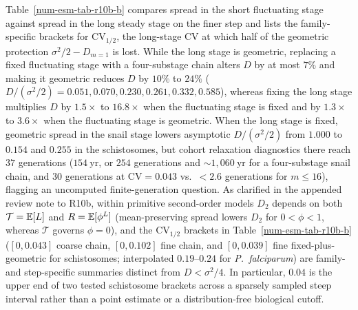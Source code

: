 Table~\ref{num-esm-tab-r10b-b} compares spread in the short fluctuating stage against spread in the long steady stage on the finer step and lists the family-specific brackets for $\mathrm{CV}_{1/2}$, the long-stage CV at which half of the geometric protection $\sigma^2/2 - D_{m=1}$ is lost. While the long stage is geometric, replacing a fixed fluctuating stage with a four-substage chain alters $D$ by at most $7\%$ and making it geometric reduces $D$ by $10\%$ to $24\%$ ($D/(\sigma^2/2) = 0.051, 0.070, 0.230, 0.261, 0.332, 0.585$), whereas fixing the long stage multiplies $D$ by $1.5\times$ to $16.8\times$ when the fluctuating stage is fixed and by $1.3\times$ to $3.6\times$ when the fluctuating stage is geometric. When the long stage is fixed, geometric spread in the snail stage lowers asymptotic $D/(\sigma^2/2)$ from $1.000$ to $0.154$ and $0.255$ in the schistosomes, but cohort relaxation diagnostics there reach $37$ generations ($154\ \mathrm{yr}$, or $254$ generations and $\sim 1{,}060\ \mathrm{yr}$ for a four-substage snail chain, and $30$ generations at $\mathrm{CV} = 0.043$ vs.\ $< 2.6$ generations for $m \le 16$), flagging an uncomputed finite-generation question. As clarified in the appended review note to R10b, within primitive second-order models $D_2$ depends on both $\mathcal{T} = \mathbb{E}[L]$ and $R = \mathbb{E}[\phi^L]$ (mean-preserving spread lowers $D_2$ for $0 < \phi < 1$, whereas $\mathcal{T}$ governs $\phi = 0$), and the $\mathrm{CV}_{1/2}$ brackets in Table~\ref{num-esm-tab-r10b-b} ($[0, 0.043]$ coarse chain, $[0, 0.102]$ fine chain, and $[0, 0.039]$ fine fixed-plus-geometric for schistosomes; interpolated $0.19$--$0.24$ for \emph{P.~falciparum}) are family- and step-specific summaries distinct from $D < \sigma^2/4$. In particular, $0.04$ is the upper end of two tested schistosome brackets across a sparsely sampled steep interval rather than a point estimate or a distribution-free biological cutoff.

